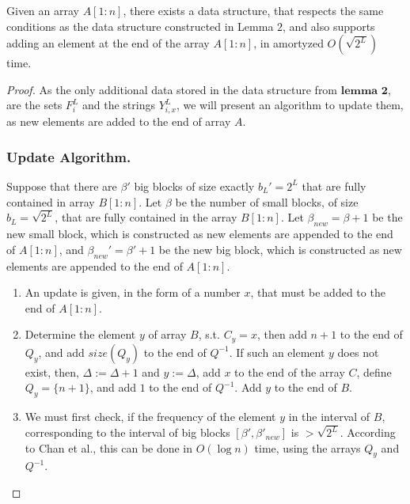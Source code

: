 \documentclass[runningheads]{llncs}
\begin{document}
\begin{lemma}
    Given an array $A[1:n]$, there exists a data structure, that respects the same conditions as the data structure constructed in 
    Lemma $2$, and also supports adding an element at the end of the array $A[1:n]$, in amortyzed $O(\sqrt{2^L})$ time.

\end{lemma}
\begin{proof}
    As the only additional data stored in the data structure from $\textbf{lemma 2}$, are the sets $F^L_i$ and the strings $Y^L_{i,x}$, 
    we will present an algorithm to update them, as new elements are added to the end of array $A$.

    \subsubsection{Update Algorithm.}
    Suppose that there are $\beta'$ big blocks of size exactly $b_L'=2^L$ that are fully contained in array $B[1:n]$. 
    Let $\beta$ be the number of small blocks, of size $b_L=\sqrt{2^L}$, that are fully contained in the array $B[1:n]$. 
    Let $\beta_{new}=\beta+1$ be the new small block, which is constructed as new elements are appended to the end of $A[1:n]$, 
    and $\beta_{new}'=\beta'+1$ be the new big block, which is constructed as new elements are appended to the end of $A[1:n]$.

    \begin{enumerate}
        \item[] An update is given, in the form of a number $x$, that must be added to the end of $A[1:n]$.
        
        \item Determine the element $y$ of array $B$, s.t. $C_{y}=x$, then add $n+1$ to the end of $Q_{y}$, and add $size(Q_{y})$ to the end of $Q^{-1}$.
        If such an element $y$ does not exist, then, $\Delta := \Delta+1$ and $y:=\Delta$, 
        add $x$ to the end of the array $C$, define $Q_{y}=\{n+1\}$, and add $1$ to the end of $Q^{-1}$. Add $y$ to the end of $B$. 
        
        \item We must first check, if the frequency of the element $y$ in the interval of $B$, 
        corresponding to the interval of big blocks $[\beta', \beta'_{new}]$ is $>\sqrt{2^L}$. 
        According to Chan et al.\cite{chan2014linear}, this can be done in $O(\log n)$ time, using the arrays $Q_{y}$ and $Q^{-1}$.


\end{enumerate}
\end{proof}
\end{document}
